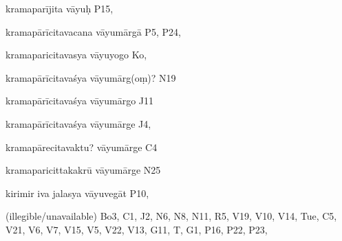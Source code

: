 \begin{marma}[hp02_009]
\begin{marma}[hp02_011]
\begin{marma}[hp02_26c]
\item[kramaparījita vāyuḥ] P15, 
\item[kramapārīcitavacana vāyumārgā] P5, P24, 
\item[kramaparicitavasya vāyuyogo] Ko,
\item[kramapārīcitavaśya vāyumārg(oṃ)?] N19
\item[kramapārīcitavaśya vāyumārgo] J11
\item[kramapārīcitavaśya vāyumārge] J4, 
\item[kramapārecitavaktu? vāyumārge] C4
\item[kramaparicittakakrū vāyumārge] N25
\item[kirimir iva jalasya vāyuvegāt] P10, 
\item[(illegible/unavailable)] Bo3, C1, J2, N6, N8, N11, R5, V19, V10, V14, Tue, C5, V21, V6, V7, V15, V5, V22, V13, G11, T, G1, P16, P22, P23, 
  \begin{description}
    \end{description}
 \end{marma}


\end{marma}
\end{marma}
